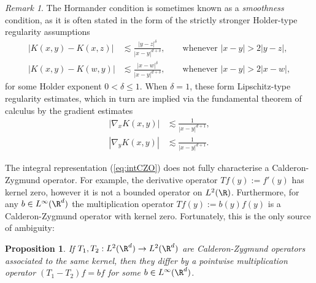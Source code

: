 \documentclass[reqno]{amsart}
\newtheorem{proposition}[theorem]{Proposition}
\theoremstyle{definition}
\theoremstyle{remark}
\newtheorem*{remark}{Remark}
\begin{document}
\begin{remark}
The Hormander condition is sometimes known as a \textit{smoothness} condition, as it is often stated in the form of the strictly stronger Holder-type regularity assumptions
	\begin{align*}
			|K(x, y) - K(x, z)| 
				&\lesssim \frac{|y - z|^\delta}{|x - y|^{d + \delta}},	\qquad \text{whenever } |x - y| > 2|y - z|,\\
			|K(x, y) - K(w, y)| 
				&\lesssim \frac{|x - w|^\delta}{|x - y|^{d + \delta}},	\qquad \text{whenever } |x - y| > 2|x - w|	,
		\end{align*}
for some Holder exponent $0 < \delta \leq 1$. When $\delta = 1$, these form Lipschitz-type regularity estimates, which in turn are implied via the fundamental theorem of calculus by the gradient estimates
	\begin{align*}
		|\nabla_x K(x, y)| 
			&\lesssim \frac{1}{|x - y|^{d + 1}}, \\
		|\nabla_y K(x, y)|
			&\lesssim \frac{1}{|x - y|^{d + 1}}.	
	\end{align*}
\end{remark}

	The integral representation (\ref{eq:intCZO}) does not fully characterise a Calderon-Zygmund operator. For example, the derivative operator $Tf(y) := f'(y)$ has kernel zero, however it is not a bounded operator on $L^2 (\R)$. Furthermore, for any $b \in L^\infty (\R^d)$ the multiplication operator $Tf(y) := b(y) f(y)$ is a Calderon-Zygmund operator with kernel zero. Fortunately, this is the only source of ambiguity:

\begin{proposition}
	If $T_1, T_2 : L^2(\R^d) \to L^2 (\R^d)$ are Calderon-Zygmund operators associated to the same kernel, then they differ by a pointwise multiplication operator $(T_1 - T_2) f = b f$ for some $b \in L^\infty (\R^d)$. 
\end{proposition}
\end{document}
